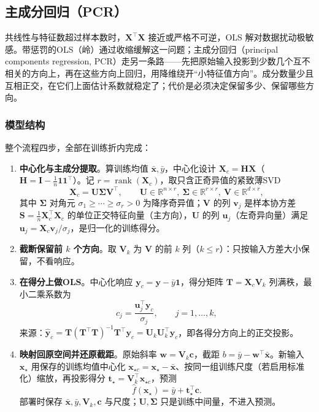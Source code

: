 \subsection{主成分回归（PCR）}
\label{sec:regression-pcr}

共线性与特征数超过样本数时，$\bm X^{\top}\bm X$ 接近或严格不可逆，OLS 解对数据扰动极敏感。带惩罚的OLS（岭）通过收缩缓解这一问题；主成分回归（principal components regression, PCR）走另一条路——先把原始输入投影到少数几个互不相关的方向上，再在这些方向上回归，用降维绕开“小特征值方向”。成分数量少且互相正交，在它们上面估计系数就稳定了；代价是必须决定保留多少、保留哪些方向。

\subsubsection{模型结构}
\label{sec:regression-pcr-structure}

整个流程四步，全部在训练折内完成：

\begin{enumerate}
  \item \textbf{中心化与主成分提取}。算训练均值 $\bar{\bm x},\bar y$，中心化设计 $\bm X_c=\bm H\bm X$（$\bm H=\bm I-\frac1n\mathbf 1\mathbf 1^{\top}$）。记 $r=\operatorname{rank}(\bm X_c)$，取只含正奇异值的紧致薄SVD
  \[
    \bm X_c=\bm U\bm\Sigma\bm V^{\top},
    \qquad
    \bm U\in\mathbb R^{n\times r},\ \bm\Sigma\in\mathbb R^{r\times r},\ \bm V\in\mathbb R^{d\times r},
  \]
  其中 $\bm\Sigma$ 对角元 $\sigma_1\geq\cdots\geq\sigma_r>0$ 为降序奇异值；$\bm V$ 的列 $\bm v_j$ 是样本协方差 $\bm S=\tfrac1n\bm X_c^{\top}\bm X_c$ 的单位正交特征向量（主方向），$\bm U$ 的列 $\bm u_j$（左奇异向量）满足 $\bm u_j=\bm X_c\bm v_j/\sigma_j$，是归一化的训练得分。
  \item \textbf{截断保留前 $k$ 个方向}。取 $\bm V_k$ 为 $\bm V$ 的前 $k$ 列（$k\leq r$）：只按输入方差大小保留，不看响应。
  \item \textbf{在得分上做OLS}。中心化响应 $\bm y_c=\bm y-\bar y\mathbf 1$，得分矩阵 $\bm T=\bm X_c\bm V_k$ 列满秩，最小二乘系数为
  \[
    c_j=\frac{\bm u_j^{\top}\bm y_c}{\sigma_j},\qquad j=1,\ldots,k,
  \]
  来源：$\widehat{\bm y}_c=\bm T(\bm T^{\top}\bm T)^{-1}\bm T^{\top}\bm y_c=\bm U_k\bm U_k^{\top}\bm y_c$，即各得分方向上的正交投影。
  \item \textbf{映射回原空间并还原截距}。原始斜率 $\bm w=\bm V_k\bm c$，截距 $b=\bar y-\bm w^{\top}\bar{\bm x}$。新输入 $\bm x_\star$ 用保存的训练均值中心化 $\bm x_{\star c}=\bm x_\star-\bar{\bm x}$、按同一组训练尺度（若启用标准化）缩放，再投影得分 $\bm t_\star=\bm V_k^{\top}\bm x_{\star c}$，预测
  \[
    \widehat f(\bm x_\star)=\bar y+\bm t_\star^{\top}\bm c.
  \]
  部署时保存 $\bar{\bm x},\bar y,\bm V_k,\bm c$ 与尺度；$\bm U,\bm\Sigma$ 只是训练中间量，不进入预测。
\end{enumerate}

